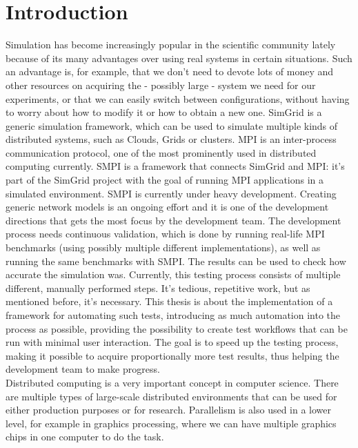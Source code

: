 
\chapter{Introduction}
\label{Chapter1}
Simulation has become increasingly popular in the scientific community
lately because of its many advantages over using real systems in
certain situations. Such an advantage is, for example, that we don't
need to devote lots of money and other resources on acquiring the -
possibly large - system we need for our experiments, or that we can
easily switch between configurations, without having to worry about
how to modify it or how to obtain a new one. SimGrid is a
generic simulation framework, which can be used to simulate multiple
kinds of distributed systems, such as Clouds, Grids or clusters. MPI
is an inter-process communication protocol, one of the most
prominently used in distributed computing currently. SMPI is a
framework that connects SimGrid and MPI: it's part of the SimGrid
project with the goal of running MPI applications in a simulated
environment. SMPI is currently under heavy development. Creating
generic network models is an ongoing effort and it is one of the
development directions that gets the most focus by the development
team. The development process needs continuous validation, which is
done by running real-life MPI benchmarks (using possibly multiple
different implementations), as well as running the same benchmarks
with SMPI. The results can be used to check how accurate the
simulation was. Currently, this testing process consists of multiple
different, manually performed steps. It's tedious, repetitive work,
but as mentioned before, it's necessary. This thesis is about the
implementation of a framework for automating such tests, introducing
as much automation into the process as possible, providing the
possibility to create test workflows that can be run with minimal user
interaction. The goal is to speed up the testing process, making it
possible to acquire proportionally more test results, thus helping the
development team to make progress.
\\
Distributed computing is a very important concept in computer
science. There are multiple types of large-scale distributed
environments that can be used for either production purposes or for
research. Parallelism is also used in a lower level, for example in
graphics processing, where we can have multiple graphics chips in one
computer to do the task.\\
